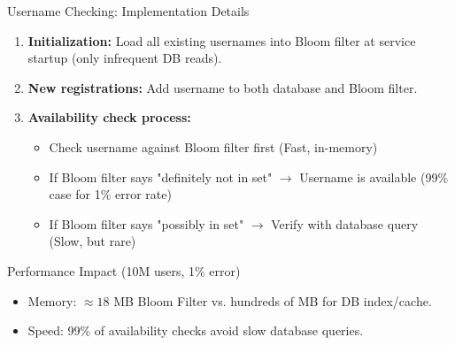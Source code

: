 \begin{frame}{Username Checking: Implementation Details}
  \begin{enumerate}
    \item \textbf{Initialization:} Load all existing usernames into Bloom filter at service startup (only infrequent DB reads).
    \item \textbf{New registrations:} Add username to both database and Bloom filter.
    \item \textbf{Availability check process:}
          \begin{itemize}
            \item Check username against Bloom filter first (Fast, in-memory)
            \item If Bloom filter says "definitely not in set" $\rightarrow$ Username is available (99\% case for 1\% error rate)
            \item If Bloom filter says "possibly in set" $\rightarrow$ Verify with database query (Slow, but rare)
          \end{itemize}
  \end{enumerate}

  \begin{block}{Performance Impact (10M users, 1\% error)}
    \begin{itemize}
      \item Memory: $\approx 18$ MB Bloom Filter vs. hundreds of MB for DB index/cache.
      \item Speed: 99\% of availability checks avoid slow database queries. \parencite{UsernameProblem2012}
    \end{itemize}
  \end{block}
\end{frame}


